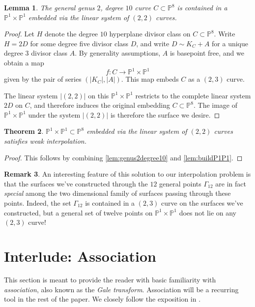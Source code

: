 \documentclass[reqno, 11pt]{amsart}
\theoremstyle{definition}
\theoremstyle{remark}
\numberwithin{equation}{section}
\numberwithin{thm}{section}
\numberwithin{prop}{section}
\numberwithin{lem}{section}
\numberwithin{cor}{section}
\numberwithin{conj}{section}
\numberwithin{defn}{section}
\renewcommand{\to}{\longrightarrow}
\newcommand {\from}{{\colon}}
\theoremstyle{plain}
\newtheorem{theorem}{Theorem}[section]
\newtheorem{lemma}[theorem]{Lemma}
\theoremstyle{definition}
\newtheorem{remark}[theorem]{Remark}
\newcommand\bp{{\mathbb P}}
\begin{document}
\begin{lemma}\label{lem:buildP1P1}
The general genus $2$, degree $10$ curve $C \subset \bp^{8}$ is contained in a $\bp^{1} \times \bp^{1}$ embedded via the linear system of $(2,2)$ curves.
\end{lemma}

\begin{proof}
Let $H$ denote the degree $10$ hyperplane divisor class on $C \subset \bp^{8}$. Write $H = 2D$ for some degree five divisor class $D$, and write $D \sim K_{C} + A$ for a unique degree $3$ divisor class $A$. By generality assumptions, $A$ is basepoint free, and we obtain a map \[f \from C \to \bp^{1} \times \bp^{1}\] given by the pair of series $(|K_{C}|, |A|)$. This map embeds $C$ as a $(2,3)$ curve.

The linear system $|(2,2)|$ on this $\bp^{1} \times \bp^{1}$ restricts to the complete linear system $2D$ on $C$, and therefore induces the original embedding $C \subset \bp^{8}$.  The image of $\bp^{1} \times \bp^{1}$ under the system $|(2,2)|$ is therefore the surface we desire.
\end{proof} 

\begin{theorem}\label{thm:weakinterpolationP1xP1}
$\bp^{1} \times \bp^{1} \subset \bp^{8}$ embedded via the linear system of $(2,2)$ curves satisfies weak interpolation.
\end{theorem}

\begin{proof}
	This follows by combining \autoref{lem:genus2degree10} and \autoref{lem:buildP1P1}.
\end{proof}

\begin{remark}
An interesting feature of this solution to our interpolation problem is that the surfaces we've constructed through the $12$ general points $\Gamma_{12}$ are in fact {\sl special} among the two dimensional family of surfaces passing through these points.  Indeed, the set $\Gamma_{12}$ is contained in a $(2,3)$ curve on the surfaces we've constructed, but a general set of twelve points on $\bp^{1}\times \bp^{1}$ does not lie on any $(2,3)$ curve!
\end{remark}

\section{Interlude: Association} 
\label{section:association}


This section is meant to provide the reader with basic familiarity with {\sl association}, also known as the {\sl Gale transform}.  Association will be a recurring tool in the rest of the paper. We closely follow the exposition in \cite{eisenbudP:the-projective-geometry-of-the-gale-transform}.
\end{document}
